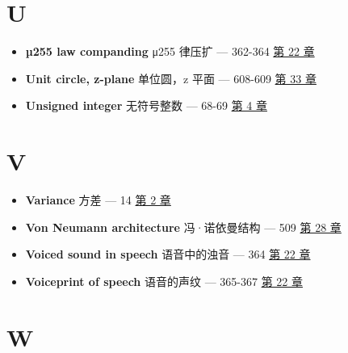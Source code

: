 \section{U}

\begin{itemize}
\tightlist
\item
  \textbf{µ255 law companding} μ255 律压扩 --- 362-364 
  \hyperref[ch-22]{第 22 章}
\item
  \textbf{Unit circle, z-plane} 单位圆，z 平面 --- 608-609 
  \hyperref[ch-33]{第 33 章}
\item
  \textbf{Unsigned integer} 无符号整数 --- 68-69 
  \hyperref[ch-04]{第 4 章}
\end{itemize}

\section{V}

\begin{itemize}
\tightlist
\item
  \textbf{Variance} 方差 --- 14  \hyperref[ch-02]{第 2 章}
\item
  \textbf{Von Neumann architecture} 冯·诺依曼结构 --- 509 
  \hyperref[ch-28]{第 28 章}
\item
  \textbf{Voiced sound in speech} 语音中的浊音 --- 364 
  \hyperref[ch-22]{第 22 章}
\item
  \textbf{Voiceprint of speech} 语音的声纹 --- 365-367 
  \hyperref[ch-22]{第 22 章}
\end{itemize}

\section{W}

